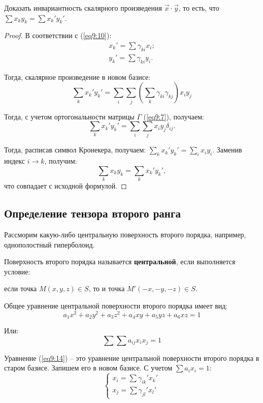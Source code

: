 	\begin{example}
	Доказать инвариантность скалярного произведения \( \vec{x}\cdot\vec{y} \), то есть, что \( \sum x_ky_k = \sum x_k' y_k' \).
	\end{example}
	
	\begin{proof}
	
	В соответствии с (\ref{eq9:10}):
	\[ \begin{array}{l}
		x_k' = \sum \gamma_{ki}x_i; \\
		y_k' = \sum \gamma_{ki}y_i.
	\end{array} \]
	
	Тогда, скалярное произведение в новом базисе:
	\[ \sum\limits_k x_k' y_k' = \sum\limits_i\sum\limits_j \left(\sum\limits_k \gamma_{ki}\gamma_{kj}\right)x_iy_j \]
	
	Тогда, с учетом ортогональности матрицы \( \Gamma \) (\ref{eq9:7}), получаем:
	\[ \sum\limits_k x_k' y_k' = \sum\limits_i\sum\limits_j x_iy_j\delta_{ij}. \]
	
	Тогда, расписав символ Кронекера, получаем: \( \sum\limits_k x_k' y_k' = \sum\limits_i x_iy_i \).
	Заменив индекс \( i \rightarrow k \), получим:
	\[ \sum\limits_k x_ky_k = \sum\limits_k x_k' y_k', \]
	что совпадает с исходной формулой.
	\end{proof}
	
\subsection{Определение тензора второго ранга}
\label{sec9.4}

	Рассморим какую-либо центральную поверхность второго порядка, например, однополостный гиперболоид. %
		
	\begin{definition}
	Поверхность второго порядка называется \textbf{центральной}, если выполняется условие:
	
	если точка \( M(x, y, z) \in S \), то и точка \( M'(-x, -y, -z) \in S \).
	\end{definition}
		
	Общее уравнение центральной поверхности второго порядка имеет вид:
	\[ a_1 x^2 + a_2 y^2 + a_3 z^2 + a_4 xy + a_5 yz + a_6 xz = 1 \]
	
	Или:
	\begin{equation}
		\sum\sum a_{ij}x_ix_j = 1 \label{eq9:14}
	\end{equation}
	
	Уравнение (\ref{eq9:14}) -- это уравнение центральной поверхности второго порядка в старом базисе. Запишем его в новом базисе. С учетом \( \sum a_ix_i = 1 \):
	\begin{equation} \left\{	\begin{array}{l}
			x_i = \sum \gamma_{ik}' x_k' \\
			x_j = \sum \gamma_{jl}' x_l'
	\end{array} \right. \label{eq9:13a} \end{equation}
	
